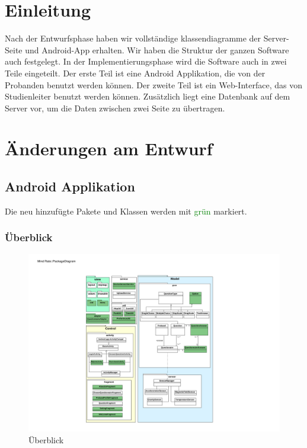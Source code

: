 \documentclass[a4paper]{scrreprt}
\begin{document}
    \tableofcontents

    \chapter{Einleitung}

        Nach der Entwurfsphase haben wir vollständige klassendiagramme der Server-Seite und Android-App erhalten. Wir haben die Struktur der ganzen Software auch festgelegt. In der Implementierungsphase wird die Software auch in zwei Teile eingeteilt. Der erste Teil ist eine Android Applikation, die von der Probanden benutzt werden können. Der zweite Teil ist ein Web-Interface, das von Studienleiter benutzt werden können. Zusätzlich liegt eine Datenbank auf dem Server vor, um die Daten zwischen zwei Seite zu übertragen.





    \newpage
    \chapter{Änderungen am Entwurf}


        \section{Android Applikation}

            Die neu hinzufügte Pakete und Klassen werden mit \textcolor{green}{grün} markiert.

            \subsection{Überblick}

                \begin{figure}[H]
                    \centering
                    \includegraphics[scale = 1.0]{Images/PackageDiagram.pdf}
                    \caption{Überblick}
                \end{figure}
\end{document}

